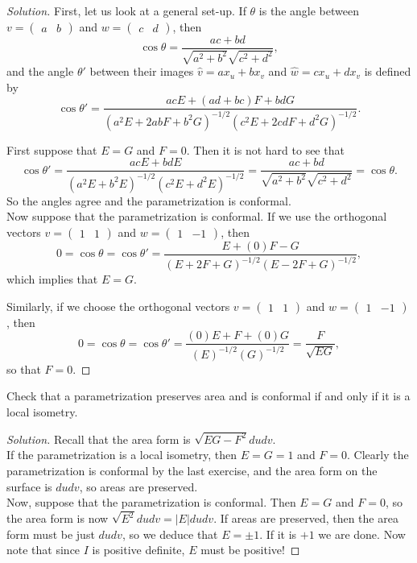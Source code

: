 \documentclass[Shifrin_Solutions_Spring_2018]{subfiles}
\begin{document}
\begin{proof}[Solution] First, let us look at a general set-up.  If $\theta$ is the angle between $v = \begin{pmatrix} a & b\end{pmatrix}$ and $w = \begin{pmatrix} c & d \end{pmatrix}$, then
\[
\cos\theta = \dfrac{ac+bd}{\sqrt{a^2+b^2}\sqrt{c^2+d^2}},
\]
and the angle $\theta'$ between their images $\hat{v} = ax_u + bx_v$ and $\hat{w} = c x_u + d x_v$ is defined by
\[
\cos \theta' = \dfrac{ac E + (ad+bc)F + bd G}{(a^2 E + 2ab F + b^2 G)^{-1/2} (c^2 E + 2cd F + d^2 G)^{-1/2} } .
\]


First suppose that $E=G$ and $F=0$. Then it is not hard to see that
\[
\cos \theta' = \dfrac{ac E +  bd E}{(a^2 E + b^2 E)^{-1/2} (c^2 E + d^2 E)^{-1/2} }  = \dfrac{ac+bd}{\sqrt{a^2+b^2}\sqrt{c^2+d^2}} = \cos\theta .
\]
So the angles agree and the parametrization is conformal.\\

Now suppose that the parametrization is conformal. If we use the orthogonal vectors $v=\begin{pmatrix} 1 & 1\end{pmatrix}$ and $w=\begin{pmatrix} 1 & -1\end{pmatrix}$, then
\[
0 = \cos\theta = \cos\theta' =\dfrac{E + (0)F - G}{( E + 2 F +  G)^{-1/2} ( E - 2 F +  G)^{-1/2} },
\]
which implies that $E=G$.

Similarly, if we choose the orthogonal vectors $v=\begin{pmatrix} 1 & 1\end{pmatrix}$ and $w=\begin{pmatrix} 1 & -1\end{pmatrix}$, then
\[
0 = \cos\theta = \cos\theta' =\dfrac{(0)E + F +(0) G}{( E )^{-1/2} (  G)^{-1/2} }= \dfrac{F}{\sqrt{EG}},
\]
so that $F=0$.
\end{proof}


\begin{exercise}
Check that a parametrization preserves area and is conformal if and only if it is a local isometry.
\end{exercise}

\begin{proof}[Solution] Recall that the area form is $\sqrt{EG-F^2}dudv$. \\

If the parametrization is a local isometry, then $E=G=1$ and $F=0$. Clearly the parametrization is conformal by the last exercise, and the area form on the surface is $dudv$, so areas are preserved. \\

Now, suppose that the parametrization is conformal. Then $E=G$ and $F=0$, so the area form is now $\sqrt{E^2}dudv = |E|dudv$. If areas are preserved, then the area form must be just $dudv$, so we deduce that $E= \pm 1$. If it is $+1$ we are done. Now note that since $I$ is positive definite, $E$ must be positive!
\end{proof}
\end{document}
